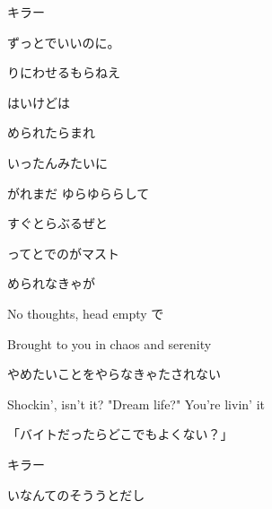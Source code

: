 \documentclass[a4paper,tate,twocolumn,12pt]{ltjtarticle}
\begin{document}
\thispagestyle{empty}

\begin{center}
{\LARGE {}キラー}

{\large ずっとでいいのに。}
\end{center}

\vspace{1em}

\begin{flushleft}

\noindent\begin{minipage}{\linewidth}
りにわせるもらねえ

はいけどは

められたらまれ

いったんみたいに

がれまだ ゆらゆららして

すぐとらぶるぜと

ってとでのがマスト
\end{minipage}

\vspace{2em}

\noindent\begin{minipage}{\linewidth}
められなきゃが

No thoughts, head empty で

Brought to you in chaos and serenity

やめたいことをやらなきゃたされない

Shockin', isn't it? "Dream life?" You're livin' it

「バイトだったらどこでもよくない？」

キラー
\end{minipage}

\vspace{2em}

\noindent\begin{minipage}{\linewidth}
いなんてのそううとだし


\end{minipage}
\end{flushleft}
\end{document}
